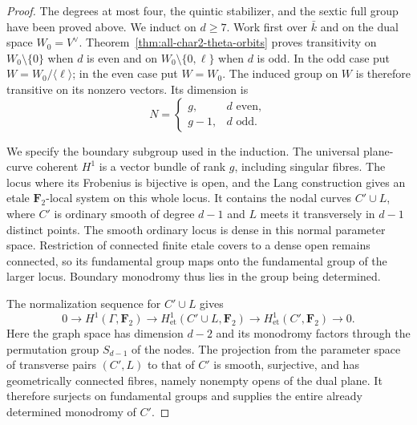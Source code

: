 \begin{proof}
The degrees at most four, the quintic stabilizer, and the sextic
full group have been proved above. We induct on $d\ge7$.
Work first over $\bar k$ and on the dual space $W_0=V^\vee$.
Theorem~\ref{thm:all-char2-theta-orbits} proves transitivity on
$W_0\setminus\{0\}$ when $d$ is even and on
$W_0\setminus\{0,\ell\}$ when $d$ is odd.
In the odd case put $W=W_0/\langle\ell\rangle$; in the even
case put $W=W_0$. The induced group on $W$ is therefore transitive
on its nonzero vectors. Its dimension is
\[
 N=\begin{cases}g,&d\text{ even},\\g-1,&d\text{ odd}.\end{cases}
\]

We specify the boundary subgroup used in the induction. The
universal plane-curve coherent $H^1$ is a vector bundle of rank
$g$, including singular fibres. The locus where its Frobenius is
bijective is open, and the Lang construction gives an etale
$\mathbf F_2$-local system on this whole locus. It contains the
nodal curves $C'\cup L$, where $C'$ is ordinary smooth of degree
$d-1$ and $L$ meets it transversely in $d-1$ distinct points.
The smooth ordinary locus is dense in this normal parameter
space. Restriction of connected finite etale covers to a dense
open remains connected, so its fundamental group maps onto the
fundamental group of the larger locus. Boundary monodromy thus
lies in the group being determined.

The normalization sequence for $C'\cup L$ gives
\[
 0\longrightarrow H^1(\Gamma,\mathbf F_2)
 \longrightarrow H^1_{\mathrm{et}}(C'\cup L,\mathbf F_2)
 \longrightarrow H^1_{\mathrm{et}}(C',\mathbf F_2)
 \longrightarrow0.
\]
Here the graph space has dimension $d-2$ and its monodromy factors
through the permutation group $S_{d-1}$ of the nodes. The
projection from the parameter space of transverse pairs $(C',L)$
to that of $C'$ is smooth, surjective, and has geometrically
connected fibres, namely nonempty opens of the dual plane.
It therefore surjects on fundamental groups and supplies the
entire already determined monodromy of $C'$.


\end{proof}
